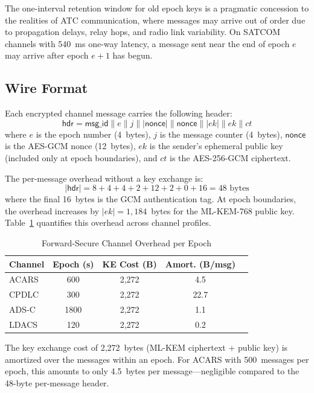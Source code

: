 \documentclass[conference,10pt]{IEEEtran}
\begin{document}
The one-interval retention window for old epoch keys is a pragmatic concession to the realities of ATC communication, where messages may arrive out of order due to propagation delays, relay hops, and radio link variability. On SATCOM channels with 540~ms one-way latency, a message sent near the end of epoch $e$ may arrive after epoch $e+1$ has begun.

\subsection{Wire Format}

Each encrypted channel message carries the following header:
\begin{equation}
    \mathsf{hdr} = \mathsf{msg\_id} \| e \| j \| |\mathsf{nonce}| \| \mathsf{nonce} \| |ek| \| ek \| ct
\end{equation}
where $e$ is the epoch number (4~bytes), $j$ is the message counter (4~bytes), $\mathsf{nonce}$ is the AES-GCM nonce (12~bytes), $ek$ is the sender's ephemeral public key (included only at epoch boundaries), and $ct$ is the AES-256-GCM ciphertext.

The per-message overhead without a key exchange is:
\begin{equation}
    |\mathsf{hdr}| = 8 + 4 + 4 + 2 + 12 + 2 + 0 + 16 = 48 \text{ bytes}
\end{equation}
where the final 16~bytes is the GCM authentication tag. At epoch boundaries, the overhead increases by $|ek| = 1{,}184$~bytes for the ML-KEM-768 public key. Table~\ref{tab:ratchet_overhead} quantifies this overhead across channel profiles.

\begin{table}[t]
\centering
\caption{Forward-Secure Channel Overhead per Epoch}
\label{tab:ratchet_overhead}
\begin{tabular}{lcccc}
\toprule
\textbf{Channel} & \textbf{Epoch (s)} & \textbf{KE Cost (B)} & \textbf{Amort. (B/msg)} \\
\midrule
ACARS & 600 & 2,272 & 4.5 \\
CPDLC & 300 & 2,272 & 22.7 \\
ADS-C & 1800 & 2,272 & 1.1 \\
LDACS & 120 & 2,272 & 0.2 \\
\bottomrule
\end{tabular}
\end{table}

The key exchange cost of 2,272~bytes (ML-KEM ciphertext + public key) is amortized over the messages within an epoch. For ACARS with 500~messages per epoch, this amounts to only 4.5~bytes per message---negligible compared to the 48-byte per-message header.
\end{document}

